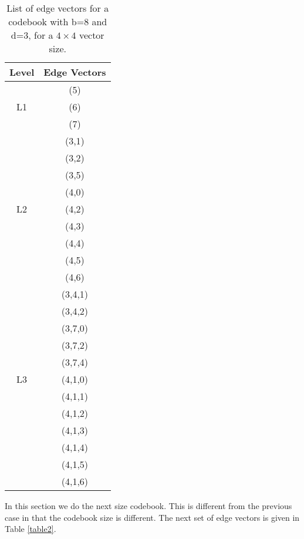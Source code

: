 \begin{table}[!t]
  \renewcommand{\arraystretch}{1.3}

  \caption{List of edge vectors for a codebook with b=8 and d=3, for a
    $4 \times 4$ vector size.}
  \label{table1}

  \centering
  \begin{tabular}{|c|c|} \hline
    Level & Edge Vectors \\ \hline

    & (5) \\ 
    L1 & (6) \\
    & (7) \\ \hline

    & (3,1)\\
    & (3,2)\\
    & (3,5)\\
    & (4,0)\\
    L2 & (4,2)\\
    & (4,3)\\
    & (4,4)\\
    & (4,5)\\
    & (4,6) \\ \hline

    & (3,4,1)\\
    & (3,4,2)\\
    & (3,7,0)\\
    & (3,7,2)\\
    & (3,7,4)\\
    L3 & (4,1,0)\\
    & (4,1,1)\\
    & (4,1,2)\\
    & (4,1,3)\\
    & (4,1,4)\\
    & (4,1,5)\\
    & (4,1,6) \\ \hline

  \end{tabular}

\end{table}


\label{sec:next-size}

In this section we do the next size codebook.  This is different from
the previous case in that the codebook size is different.  The next
set of edge vectors is given in Table \ref{table2}.

\label{sec:final-size}

